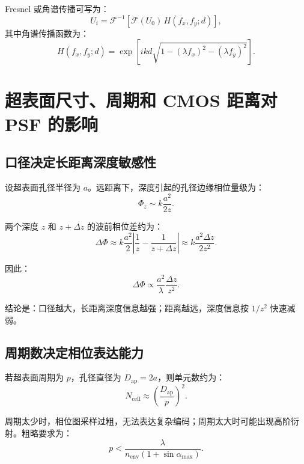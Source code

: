 \documentclass[11pt,a4paper,fontset=none]{ctexart}
\begin{document}
Fresnel 或角谱传播可写为：
\begin{equation}
  U_i
  =
  \mathcal F^{-1}
  \left[
  \mathcal F(U_0)\,
  H(f_x,f_y;d)
  \right],
\end{equation}
其中角谱传播函数为：
\begin{equation}
  H(f_x,f_y;d)
  =
  \exp
  \left[
  ikd
  \sqrt{
  1-(\lambda f_x)^2-(\lambda f_y)^2
  }
  \right].
\end{equation}

\section{超表面尺寸、周期和 CMOS 距离对 PSF 的影响}

\subsection{口径决定长距离深度敏感性}

设超表面孔径半径为 $a$。远距离下，深度引起的孔径边缘相位量级为：
\begin{equation}
  \Phi_z\sim k\frac{a^2}{2z}.
\end{equation}

两个深度 $z$ 和 $z+\Delta z$ 的波前相位差约为：
\begin{equation}
  \Delta\Phi
  \approx
  k\frac{a^2}{2}
  \left|
  \frac{1}{z}-\frac{1}{z+\Delta z}
  \right|
  \approx
  k\frac{a^2\Delta z}{2z^2}.
\end{equation}

因此：
\begin{equation}
  \Delta\Phi\propto \frac{a^2}{\lambda}\frac{\Delta z}{z^2}.
\end{equation}

结论是：口径越大，长距离深度信息越强；距离越远，深度信息按 $1/z^2$ 快速减弱。

\subsection{周期数决定相位表达能力}

若超表面周期为 $p$，孔径直径为 $D_{\mathrm{ap}}=2a$，则单元数约为：
\begin{equation}
  N_{\mathrm{cell}}
  \approx
  \left(\frac{D_{\mathrm{ap}}}{p}\right)^2.
\end{equation}

周期太少时，相位图采样过粗，无法表达复杂编码；周期太大时可能出现高阶衍射。粗略要求为：
\begin{equation}
  p<
  \frac{\lambda}{n_{\mathrm{env}}(1+\sin\alpha_{\max})}.
\end{equation}
\end{document}

